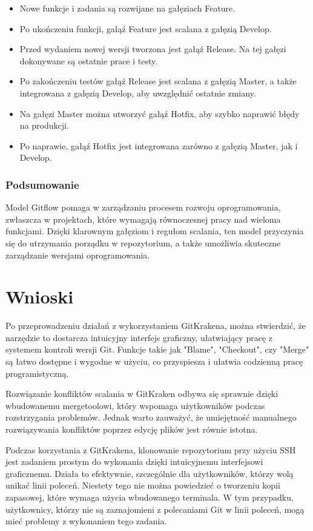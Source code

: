\documentclass[a4paper,12pt]{article}
\begin{document}
\begin{itemize}
    \item Nowe funkcje i zadania są rozwijane na gałęziach Feature.
    \item Po ukończeniu funkcji, gałąź Feature jest scalana z gałęzią Develop.
    \item Przed wydaniem nowej wersji tworzona jest gałąź Release. Na tej gałęzi dokonywane są ostatnie prace i testy.
    \item Po zakończeniu testów gałąź Release jest scalana z gałęzią Master, a także integrowana z gałęzią Develop, aby uwzględnić ostatnie zmiany.
    \item Na gałęzi Master można utworzyć gałąź Hotfix, aby szybko naprawić błędy na produkcji.
    \item Po naprawie, gałąź Hotfix jest integrowana zarówno z gałęzią Master, jak i Develop.
\end{itemize}

\subsubsection{Podsumowanie}
Model Gitflow pomaga w zarządzaniu procesem rozwoju oprogramowania, zwłaszcza w projektach, które wymagają równoczesnej pracy nad wieloma funkcjami. Dzięki klarownym gałęziom i regułom scalania, ten model przyczynia się do utrzymania porządku w repozytorium, a także umożliwia skuteczne zarządzanie wersjami oprogramowania.

\newpage
\clearpage

\section{Wnioski}
Po przeprowadzeniu działań z wykorzystaniem GitKrakena, można stwierdzić, że narzędzie to dostarcza intuicyjny interfejs graficzny, ułatwiający  pracę z systemem kontroli wersji Git. Funkcje takie jak "Blame", "Checkout", czy "Merge" są łatwo dostępne i wygodne w użyciu, co przyspiesza i ułatwia codzienną pracę programistyczną.

Rozwiązanie konfliktów scalania w GitKraken odbywa się sprawnie dzięki wbudowanemu mergetoolowi, który wspomaga użytkowników podczas rozstrzygania problemów. Jednak warto zauważyć, że umiejętność manualnego rozwiązywania konfliktów poprzez edycję plików jest równie istotna.

Podczas korzystania z GitKrakena, klonowanie repozytorium przy użyciu SSH jest zadaniem prostym do wykonania dzięki intuicyjnemu interfejsowi graficznemu. Działa to efektywnie, szczególnie dla użytkowników, którzy wolą unikać linii poleceń. Niestety tego nie można powiedzieć o tworzeniu kopii zapasowej, które wymaga użycia wbudowanego terminala. W tym przypadku, użytkownicy, którzy nie są zaznajomieni z polecaniami Git w linii poleceń, mogą mieć problemy z wykonaniem tego zadania.
\end{document}
